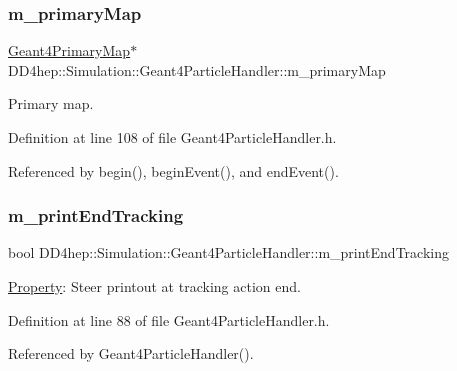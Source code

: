 \subsubsection{\texorpdfstring{m\+\_\+primary\+Map}{m\_primaryMap}}
{\footnotesize\ttfamily \hyperlink{class_d_d4hep_1_1_simulation_1_1_geant4_primary_map}{Geant4\+Primary\+Map}$\ast$ D\+D4hep\+::\+Simulation\+::\+Geant4\+Particle\+Handler\+::m\+\_\+primary\+Map\hspace{0.3cm}{\ttfamily [protected]}}



Primary map. 



Definition at line 108 of file Geant4\+Particle\+Handler.\+h.



Referenced by begin(), begin\+Event(), and end\+Event().

\hypertarget{class_d_d4hep_1_1_simulation_1_1_geant4_particle_handler_a6d1f66487284fd0d7f61633c5fd891f1}{}\label{class_d_d4hep_1_1_simulation_1_1_geant4_particle_handler_a6d1f66487284fd0d7f61633c5fd891f1} 
\subsubsection{\texorpdfstring{m\+\_\+print\+End\+Tracking}{m\_printEndTracking}}
{\footnotesize\ttfamily bool D\+D4hep\+::\+Simulation\+::\+Geant4\+Particle\+Handler\+::m\+\_\+print\+End\+Tracking\hspace{0.3cm}{\ttfamily [protected]}}



\hyperlink{class_d_d4hep_1_1_property}{Property}\+: Steer printout at tracking action end. 



Definition at line 88 of file Geant4\+Particle\+Handler.\+h.



Referenced by Geant4\+Particle\+Handler().

\hypertarget{class_d_d4hep_1_1_simulation_1_1_geant4_particle_handler_a1960c5fe6223f3ec578196b79a5aa088}{}\label{class_d_d4hep_1_1_simulation_1_1_geant4_particle_handler_a1960c5fe6223f3ec578196b79a5aa088} 
